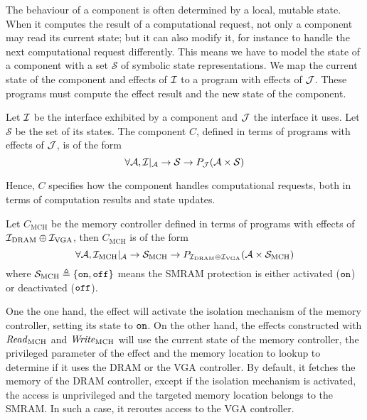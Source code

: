 The behaviour of a component is often determined by a local, mutable state.
%
When it computes the result of a computational request, not only a component may
read its current state; but it can also modify it, for instance to handle the
next computational request differently.
%
This means we have to model the state of a component with a set $\mathcal{S}$ of
symbolic state representations.
%
We map the current state of the component and effects of $\mathcal{I}$ to a program with
effects of $\mathcal{J}$.
%
These programs must compute the effect result and the new state of the
component.

\begin{definition}[Component] \label{def:freespec:component-model} Let $\mathcal{I}$ be
  the interface exhibited by a component and $\mathcal{J}$ the interface it uses.
  Let $\mathcal{S}$ be the set of its states.
  The component $C$, defined in terms of programs with effects of $\mathcal{J}$, is of
  the form
  \[ \forall \mathcal{A}, \mathcal{I}|_{\mathcal{A}} \rightarrow \mathcal{S}
    \rightarrow P_{\mathcal{J}}(\mathcal{A} \times \mathcal{S}) \]
\end{definition}

Hence, $C$ specifies how the component handles computational requests, both in
terms of computation results and state updates.

\begin{example}
  \label{ex:mch-specs}

  Let $C_{\mathrm{MCH}}$ be the memory controller defined in terms of programs
  with effects of $\mathcal{I}_{\mathrm{DRAM}} \oplus \mathcal{I}_{\mathrm{VGA}}$, then
  $C_{\mathrm{MCH}}$ is of the form
  \[
    \forall \mathcal{A}, \mathcal{I}_{\mathrm{MCH}}|_{\mathcal{A}} \rightarrow
    \mathcal{S}_{\mathrm{MCH}} \rightarrow P_{\mathcal{I}_{\mathrm{DRAM}} \oplus
      \mathcal{I}_{\mathrm{VGA}}}(\mathcal{A} \times \mathcal{S}_{\mathrm{MCH}})
  \] where $\mathcal{S}_{\mathrm{MCH}} \triangleq \{ \mathtt{on}, \mathtt{off} \}$
  means the SMRAM protection is either activated ($\mathtt{on}$) or deactivated
  ($\mathtt{off}$).

  One the one hand, the  effect will activate the isolation mechanism
  of the memory controller, setting its state to $\mathtt{on}$.
  On the other hand, the effects constructed with $\mathit{Read}_{\mathrm{MCH}}$
  and $\mathit{Write}_{\mathrm{MCH}}$ will use the current state of the memory
  controller, the privileged parameter of the effect and the memory location to
  lookup to determine if it uses the DRAM or the VGA controller.
  By default, it fetches the memory of the DRAM controller, except if the
  isolation mechanism is activated, the access is unprivileged and the targeted
  memory location belongs to the SMRAM.
  In such a case, it reroutes access to the VGA controller.
\end{example}

